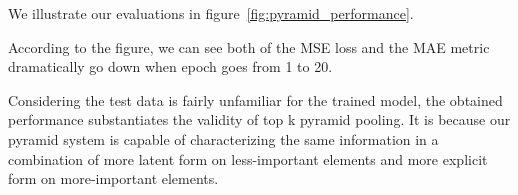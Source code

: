 We illustrate our evaluations in figure~\ref{fig:pyramid_performance}.

According to the figure, we can see both of the MSE loss and the MAE metric dramatically go down when epoch goes from 1 to 20.

Considering the test data is fairly unfamiliar for the trained model, the obtained performance substantiates the validity of top k pyramid pooling. It is because our pyramid system is capable of characterizing the same information in a combination of more latent form on less-important elements and more explicit form on more-important elements.






























